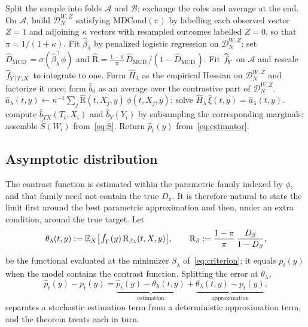 \documentclass[11pt]{article}
\theoremstyle{plain}
\theoremstyle{definition}
\theoremstyle{remark}
\newcommand{\mcd}{\text{MCD}\,}
\newcommand{\MDC}{\ensuremath{\text{MDCond}}}
\newcommand{\pE}{\ensuremath{\mathbb{E}}}
\newcommand{\pf}[1]{\ensuremath{\,\mathlarger{\textit{f}}_{#1}}}
\newcommand{\pfhat}[1]{\ensuremath{\,\mathlarger{\widehat{\textit{f}}}_{#1}}}
\newcommand{\ratio}{\ensuremath{\pi}}
\newcommand{\contrast}{D_{\ratio}}
\newcommand{\contrasthat}{\widehat{D}_{\mcd}}
\newcommand{\DensityRatio}{\text{R}}
\newcommand{\mDwz}[1]{\ensuremath{\mathcal{D}}_{#1}^{W,Z}}
\newcommand{\betahat}{\widehat{\beta}}
\newcommand{\score}{S}
\begin{document}
\begin{algorithm}[htbp]
\caption{Corrected estimator of $p_t(y)$ with a penalized logistic contrast}
\label{alg:main}
\begin{algorithmic}[1]
\State Split the sample into folds $\mathcal{A}$ and $\mathcal{B}$; exchange the roles and average at the end.
\State On $\mathcal{A}$, build $\mDwz{N}$ satisfying $\MDC(\ratio)$ by labelling each observed vector $Z=1$ and adjoining $\kappa$ vectors with resampled outcomes labelled $Z=0$, so that $\ratio = 1/(1+\kappa)$.
\State Fit $\betahat_\lambda$ by penalized logistic regression on $\mDwz{N}$; set $\contrasthat = \sigma(\betahat_\lambda^\top \phi)$ and $\widehat{\DensityRatio} = \tfrac{1-\ratio}{\ratio}\,\contrasthat/(1-\contrasthat)$.
\State Fit $\pfhat{Y}$ on $\mathcal{A}$ and rescale $\pfhat{Y \mid T,X}$ to integrate to one.
\State Form $\widehat H_\lambda$ as the empirical Hessian on $\mDwz{N}$ and factorize it once; form $\widehat b_0$ as an average over the contrastive part of $\mDwz{N}$.
  \State $\widehat a_\lambda(t,y) \gets n^{-1}\sum_j \widehat{\DensityRatio}(t,X_j,y)\,\phi(t,X_j,y)$;
  \State solve $\widehat H_\lambda\, \widehat\xi(t,y) = \widehat a_\lambda(t,y)$.
\EndFor
{}
  \State compute $\widehat b_{TX}(T_i,X_i)$ and $\widehat b_Y(Y_i)$ by subsampling the corresponding marginals;
  \State assemble $\widehat \score(W_i)$ from~\eqref{eq:S}.
\EndFor
\State Return $\widehat p_t(y)$ from~\eqref{eq:estimator}.
\end{algorithmic}
\end{algorithm}

\subsection{Asymptotic distribution}
\label{sec:mcd-asymptotics}

The contrast function is estimated within the parametric family indexed by $\phi$, and that
family need not contain the true $\contrast$. It is therefore natural to state the limit first
around the best parametric approximation and then, under an extra condition, around the true
target. Let
\begin{equation}
\theta_\lambda(t,y) := \pE_X\big[ \pf{Y}(y)\,\DensityRatio_{\beta_\lambda}(t,X,y) \big],
\qquad
\DensityRatio_{\beta} := \frac{1-\ratio}{\ratio}\,\frac{D_\beta}{1-D_\beta},
\label{eq:pseudo-true}
\end{equation}
be the functional evaluated at the minimizer $\beta_\lambda$ of~\eqref{eq:criterion}; it equals
$p_t(y)$ when the model contains the contrast function. Splitting the error at
$\theta_\lambda$,
\begin{equation}
\widehat p_t(y) - p_t(y)
= \underbrace{\widehat p_t(y) - \theta_\lambda(t,y)}_{\text{estimation}}
+ \underbrace{\theta_\lambda(t,y) - p_t(y)}_{\text{approximation}} ,
\label{eq:decomposition}
\end{equation}
separates a stochastic estimation term from a deterministic approximation term, and the theorem
treats each in turn.
\end{document}
